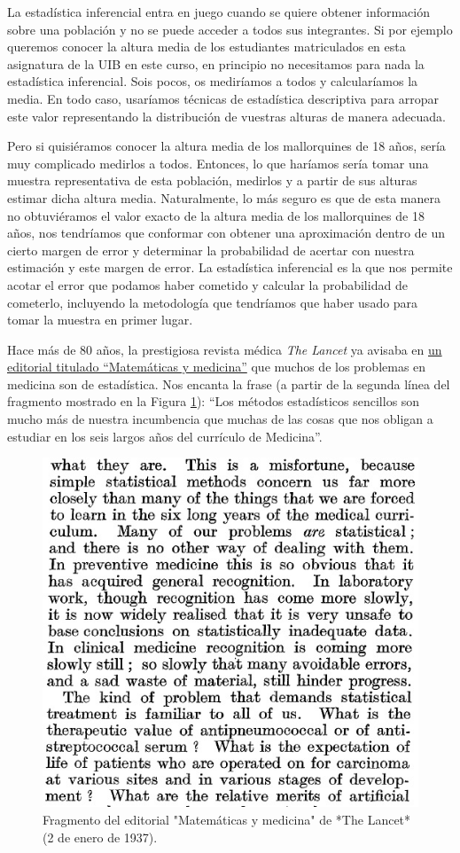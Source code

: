 \documentclass[
]{book}
\theoremstyle{definition}
\theoremstyle{definition}
\theoremstyle{definition}
\theoremstyle{definition}
\theoremstyle{remark}
\begin{document}
La estadística inferencial entra en juego cuando se quiere obtener información sobre una población y no se puede acceder a todos sus integrantes. Si por ejemplo queremos conocer la altura media de los estudiantes matriculados en esta asignatura de la UIB en este curso, en principio no necesitamos para nada la estadística inferencial. Sois pocos, os mediríamos a todos y calcularíamos la media. En todo caso, usaríamos técnicas de estadística descriptiva para arropar este valor representando la distribución de vuestras alturas de manera adecuada.

Pero si quisiéramos conocer la altura media de los mallorquines de 18 años, sería muy complicado medirlos a todos. Entonces, lo que haríamos sería tomar una muestra representativa de esta población, medirlos y a partir de sus alturas estimar dicha altura media. Naturalmente, lo más seguro es que de esta manera no obtuviéramos el valor exacto de la altura media de los mallorquines de 18 años, nos tendríamos que conformar con obtener una aproximación dentro de un cierto margen de error y determinar la probabilidad de acertar con nuestra estimación y este margen de error. La estadística inferencial es la que nos permite acotar el error que podamos haber cometido y calcular la probabilidad de cometerlo, incluyendo la metodología que tendríamos que haber usado para tomar la muestra en primer lugar.

Hace más de 80 años, la prestigiosa revista médica \emph{The Lancet} ya avisaba en \href{https://www.sciencedirect.com/science/article/abs/pii/S0140673600865708}{un editorial titulado ``Matemáticas y medicina''} que muchos de los problemas en medicina son de estadística. Nos encanta la frase (a partir de la segunda línea del fragmento mostrado en la Figura \ref{fig:lancet2}): ``Los métodos estadísticos sencillos son mucho más de nuestra incumbencia que muchas de las cosas que nos obligan a estudiar en los seis largos años del currículo de Medicina''.

\begin{figure}

{\centering \includegraphics[width=0.5\linewidth]{INREMDN_files/figure-html/lancet2} 

}

\caption{Fragmento del editorial "Matemáticas y medicina" de *The Lancet* (2 de enero de 1937).}\label{fig:lancet2}
\end{figure}
\end{document}

